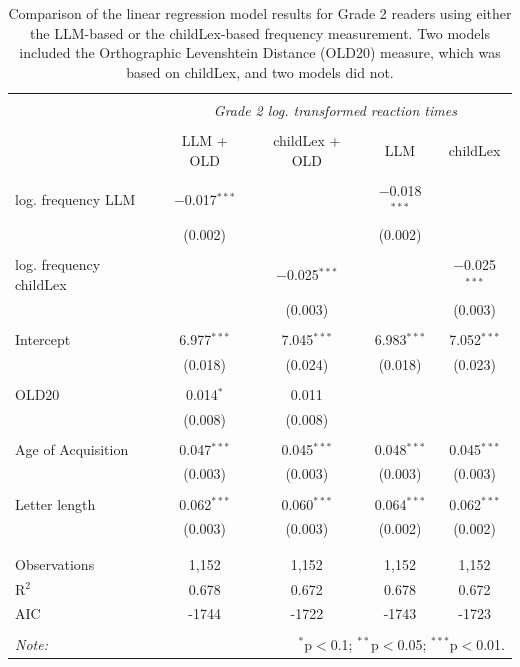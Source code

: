 \documentclass[doc, a4paper, anonymous]{apa7}
\begin{document}
\begin{table}[!htbp] \centering 
  \caption{Comparison of the linear regression model results for Grade 2 readers using either the LLM-based or the childLex-based frequency measurement. Two models included the Orthographic Levenshtein Distance (OLD20) measure, which was based on childLex, and two models did not.} 
  \label{G2stats} 
\begin{tabular}{@{\extracolsep{5pt}}lcccc} 
\\[-1.8ex]\hline 
\hline \\[-1.8ex] 
 & \multicolumn{4}{c}{\textit{Grade 2 log. transformed reaction times}} \\ 
\cline{2-5} 
\\[-1.8ex] & LLM + OLD & childLex + OLD & LLM & childLex\\ 
\hline \\[-1.8ex] 
log. frequency LLM & $-$0.017$^{***}$ &  & $-$0.018$^{***}$ &  \\ 
  & (0.002) &  & (0.002) &  \\ 
  & & & & \\ 
 log. frequency childLex &  & $-$0.025$^{***}$ &  & $-$0.025$^{***}$ \\ 
  &  & (0.003) &  & (0.003) \\ 
  & & & & \\
  Intercept & 6.977$^{***}$ & 7.045$^{***}$ & 6.983$^{***}$ & 7.052$^{***}$ \\ 
  & (0.018) & (0.024) & (0.018) & (0.023) \\ 
  & & & & \\ 
  OLD20 & 0.014$^{*}$ & 0.011 &  &  \\ 
  & (0.008) & (0.008) &  &  \\ 
  & & & & \\ 
 Age of Acquisition & 0.047$^{***}$ & 0.045$^{***}$ & 0.048$^{***}$ & 0.045$^{***}$ \\ 
  & (0.003) & (0.003) & (0.003) & (0.003) \\ 
  & & & & \\ 
 Letter length & 0.062$^{***}$ & 0.060$^{***}$ & 0.064$^{***}$ & 0.062$^{***}$ \\ 
  & (0.003) & (0.003) & (0.002) & (0.002) \\ 
  & & & & \\  
\hline \\[-1.8ex] 
Observations & 1,152 & 1,152 & 1,152 & 1,152 \\ 
R$^{2}$ & 0.678 & 0.672 & 0.678 & 0.672 \\ 
AIC & -1744 & -1722 & -1743 & -1723 \\ 

\hline 
\hline \\[-1.8ex] 
\textit{Note:}  & \multicolumn{4}{r}{$^{*}$p$<$0.1; $^{**}$p$<$0.05; $^{***}$p$<$0.01.} \\ 
\end{tabular} 
\end{table} 
\end{document}
